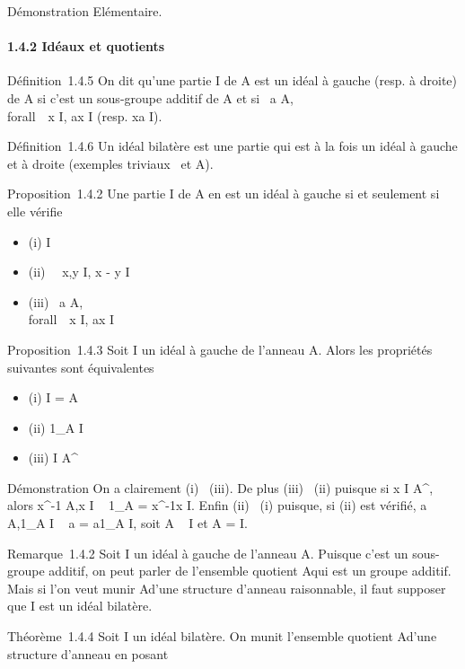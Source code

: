 \documentclass[]{article}
\begin{document}
Démonstration Elémentaire.

\paragraph{1.4.2 Idéaux et quotients}

Définition~1.4.5 On dit qu'une partie I de A est un idéal à gauche
(resp. à droite) de A si c'est un sous-groupe additif de A et si
\forall~a \in A,\\forall~~x \in I, ax \in
I (resp. xa \in I).

Définition~1.4.6 Un idéal bilatère est une partie qui est à la fois un
idéal à gauche et à droite (exemples triviaux
\0\ et A).

Proposition~1.4.2 Une partie I de A en est un idéal à gauche si et
seulement si elle vérifie

\begin{itemize}
\itemsep1pt\parskip0pt
\item
  (i) I\neq~\varnothing~
\item
  (ii) \forall~~x,y \in I, x - y \in I
\item
  (iii) \forall~a \in A,\\forall~~x \in
  I, ax \in I
\end{itemize}

Proposition~1.4.3 Soit I un idéal à gauche de l'anneau A. Alors les
propriétés suivantes sont équivalentes

\begin{itemize}
\itemsep1pt\parskip0pt
\item
  (i) I = A
\item
  (ii) 1\_A \in I
\item
  (iii) I \bigcap A^\times\neq~\varnothing~
\end{itemize}

Démonstration On a clairement (i) \rigtharrow~(iii). De plus (iii) \rigtharrow~(ii) puisque si
x \in I \bigcap A^\times, alors x^-1 \in A,x \in I \rigtharrow~ 1\_A =
x^-1x \in I. Enfin (ii) \rigtharrow~(i) puisque, si (ii) est vérifié, a \in
A,1\_A \in I \rigtharrow~ a = a1\_A \in I, soit A \subset~ I et A = I.

Remarque~1.4.2 Soit I un idéal à gauche de l'anneau A. Puisque c'est un
sous-groupe additif, on peut parler de l'ensemble quotient A\diagupI qui est
un groupe additif. Mais si l'on veut munir A\diagupI d'une structure d'anneau
raisonnable, il faut supposer que I est un idéal bilatère.

Théorème~1.4.4 Soit I un idéal bilatère. On munit l'ensemble quotient
A\diagupI d'une structure d'anneau en posant
\end{document}
